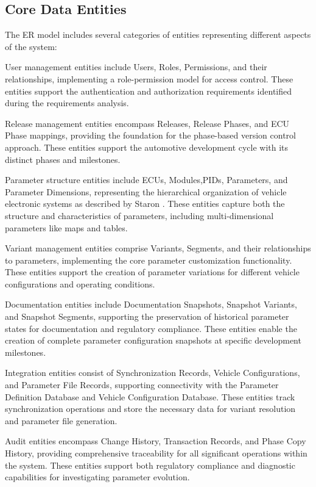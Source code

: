 \subsection{Core Data Entities}
\label{subsec:core-data-entities}

The ER model includes several categories of entities representing different aspects of the system:

User management entities include Users, Roles, Permissions, and their relationships, implementing a role-permission model for access control. These entities support the authentication and authorization requirements identified during the requirements analysis.

Release management entities encompass Releases, Release Phases, and \ac{ECU} Phase mappings, providing the foundation for the phase-based version control approach. These entities support the automotive development cycle with its distinct phases and milestones.

Parameter structure entities include \acp{ECU}, Modules,\acp{PID}, Parameters, and Parameter Dimensions, representing the hierarchical organization of vehicle electronic systems as described by Staron \cite{staron2021automotive}. These entities capture both the structure and characteristics of parameters, including multi-dimensional parameters like maps and tables.

Variant management entities comprise Variants, Segments, and their relationships to parameters, implementing the core parameter customization functionality. These entities support the creation of parameter variations for different vehicle configurations and operating conditions.

Documentation entities include Documentation Snapshots, Snapshot Variants, and Snapshot Segments, supporting the preservation of historical parameter states for documentation and regulatory compliance. These entities enable the creation of complete parameter configuration snapshots at specific development milestones.

Integration entities consist of Synchronization Records, Vehicle Configurations, and Parameter File Records, supporting connectivity with the Parameter Definition Database and Vehicle Configuration Database. These entities track synchronization operations and store the necessary data for variant resolution and parameter file generation.

Audit entities encompass Change History, Transaction Records, and Phase Copy History, providing comprehensive traceability for all significant operations within the system. These entities support both regulatory compliance and diagnostic capabilities for investigating parameter evolution.

